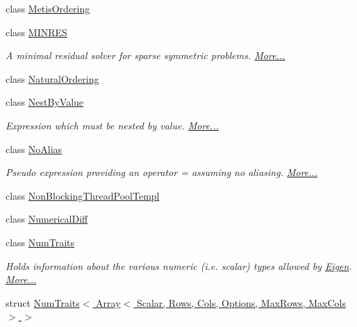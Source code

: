 \begin{DoxyCompactItemize}
class \hyperlink{class_eigen_1_1_metis_ordering}{Metis\+Ordering}
\item 
class \hyperlink{group___iterative_linear_solvers___module_class_eigen_1_1_m_i_n_r_e_s}{M\+I\+N\+R\+ES}
\begin{DoxyCompactList}\small\item\em A minimal residual solver for sparse symmetric problems.  \hyperlink{group___iterative_linear_solvers___module_class_eigen_1_1_m_i_n_r_e_s}{More...}\end{DoxyCompactList}\item 
class \hyperlink{group___ordering_methods___module_class_eigen_1_1_natural_ordering}{Natural\+Ordering}
\item 
class \hyperlink{group___core___module_class_eigen_1_1_nest_by_value}{Nest\+By\+Value}
\begin{DoxyCompactList}\small\item\em Expression which must be nested by value.  \hyperlink{group___core___module_class_eigen_1_1_nest_by_value}{More...}\end{DoxyCompactList}\item 
class \hyperlink{group___core___module_class_eigen_1_1_no_alias}{No\+Alias}
\begin{DoxyCompactList}\small\item\em Pseudo expression providing an operator = assuming no aliasing.  \hyperlink{group___core___module_class_eigen_1_1_no_alias}{More...}\end{DoxyCompactList}\item 
class \hyperlink{class_eigen_1_1_non_blocking_thread_pool_templ}{Non\+Blocking\+Thread\+Pool\+Templ}
\item 
class \hyperlink{class_eigen_1_1_numerical_diff}{Numerical\+Diff}
\item 
class \hyperlink{group___core___module_struct_eigen_1_1_num_traits}{Num\+Traits}
\begin{DoxyCompactList}\small\item\em Holds information about the various numeric (i.\+e. scalar) types allowed by \hyperlink{namespace_eigen}{Eigen}.  \hyperlink{group___core___module_struct_eigen_1_1_num_traits}{More...}\end{DoxyCompactList}\item 
struct \hyperlink{struct_eigen_1_1_num_traits_3_01_array_3_01_scalar_00_01_rows_00_01_cols_00_01_options_00_01_max_rows_00_01_max_cols_01_4_01_4}{Num\+Traits$<$ Array$<$ Scalar, Rows, Cols, Options, Max\+Rows, Max\+Cols $>$ $>$}
\item 

\end{DoxyCompactItemize}

